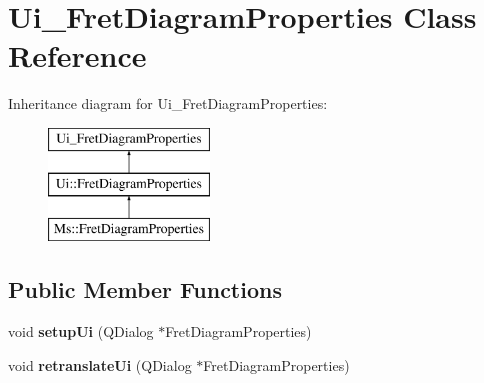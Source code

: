 \hypertarget{class_ui___fret_diagram_properties}{}\section{Ui\+\_\+\+Fret\+Diagram\+Properties Class Reference}
\label{class_ui___fret_diagram_properties}
Inheritance diagram for Ui\+\_\+\+Fret\+Diagram\+Properties\+:\begin{figure}[H]
\begin{center}
\leavevmode
\includegraphics[height=3.000000cm]{class_ui___fret_diagram_properties}
\end{center}
\end{figure}
\subsection*{Public Member Functions}
\begin{DoxyCompactItemize}
\item 
\mbox{\label{class_ui___fret_diagram_properties_a413db8e8262fde9e6cf341041c17a989}} 
void {\bfseries setup\+Ui} (Q\+Dialog $\ast$Fret\+Diagram\+Properties)
\item 
\mbox{\label{class_ui___fret_diagram_properties_a78877ad4a5b07e4aff7720fe2e3b55d4}} 
void {\bfseries retranslate\+Ui} (Q\+Dialog $\ast$Fret\+Diagram\+Properties)
\end{DoxyCompactItemize}

